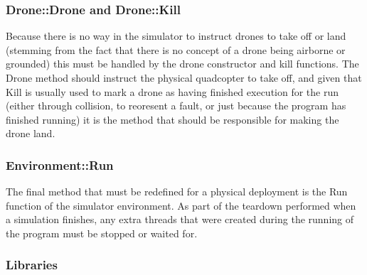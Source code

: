 \subsubsection{Drone::Drone and Drone::Kill}
Because there is no way in the simulator to instruct drones to take off or land (stemming from the fact that there is no concept of a drone being airborne or grounded) this must be handled by the drone constructor and kill functions. The Drone method should instruct the physical quadcopter to take off, and given that Kill is usually used to mark a drone as having finished execution for the run (either through collision, to reoresent a fault, or just because the program has finished running) it is the method that should be responsible for making the drone land.

\subsubsection{Environment::Run}
The final method that must be redefined for a physical deployment is the Run function of the simulator environment. As part of the teardown performed when a simulation finishes, any extra threads that were created during the running of the program must be stopped or waited for.

\subsubsection{Libraries}
